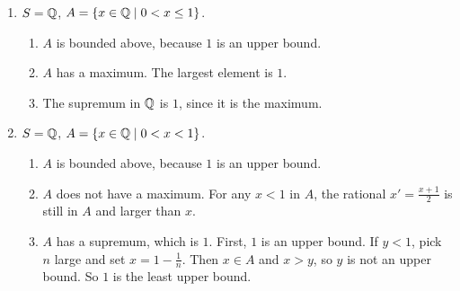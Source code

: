 \documentclass{report}
\begin{document}
\begin{proofWithHibiscus}
\begin{enumerate}
    \item $S = \mathbb{Q}$, $A = \{x \in \mathbb{Q} \mid 0<x \le 1\}$.  
      \begin{enumerate}
        \item $A$ is bounded above, because $1$ is an upper bound.  
        \item $A$ has a maximum. The largest element is $1$.  
        \item The supremum in $\mathbb{Q}$ is $1$, since it is the maximum.  
      \end{enumerate}
  
    \item $S = \mathbb{Q}$, $A = \{x \in \mathbb{Q} \mid 0<x<1\}$.  
      \begin{enumerate}
        \item $A$ is bounded above, because $1$ is an upper bound.  
        \item $A$ does not have a maximum. For any $x<1$ in $A$, the rational $x'=\tfrac{x+1}{2}$ is still in $A$ and larger than $x$.  
        \item $A$ has a supremum, which is $1$. First, $1$ is an upper bound. If $y<1$, pick $n$ large and set $x=1-\tfrac1n$. Then $x \in A$ and $x>y$, so $y$ is not an upper bound. So $1$ is the least upper bound.  
      \end{enumerate}
  \end{enumerate}
  \end{proofWithHibiscus}
  
  


\end{document}
